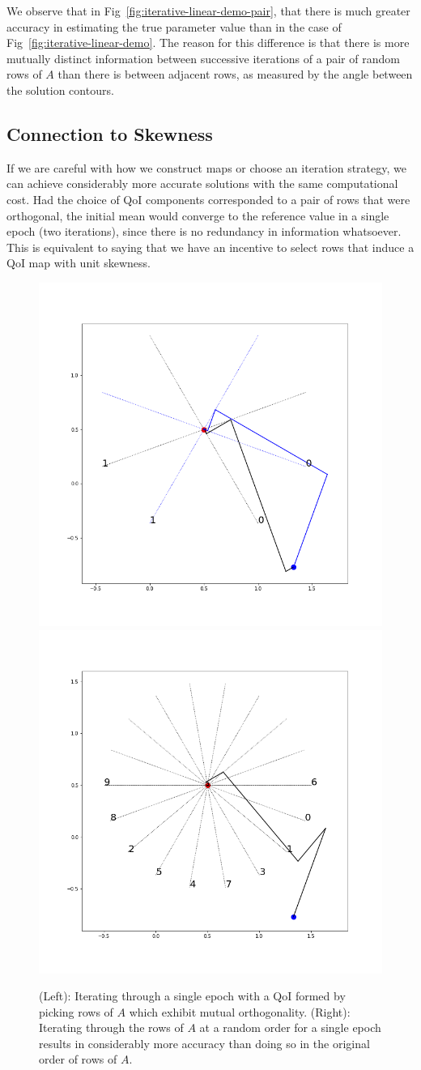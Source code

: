 We observe that in Fig~\ref{fig:iterative-linear-demo-pair}, that there is much greater accuracy in estimating the true parameter value than in the case of Fig~\ref{fig:iterative-linear-demo}.
The reason for this difference is that there is more mutually distinct information between successive iterations of a pair of random rows of $A$ than there is between adjacent rows, as measured by the angle between the solution contours.

\subsection{Connection to Skewness}
If we are careful with how we construct maps or choose an iteration strategy, we can achieve considerably more accurate solutions with the same computational cost.
Had the choice of QoI components corresponded to a pair of rows that were orthogonal, the initial mean would converge to the reference value in a single epoch (two iterations), since there is no redundancy in information whatsoever.
This is equivalent to saying that we have an incentive to select rows that induce a QoI map with unit skewness.

\begin{figure}
  \centering
  \includegraphics[width=0.475\linewidth]{examples/iterative/10D-firstepoch-pair-smart.png}
  \includegraphics[width=0.475\linewidth]{examples/iterative/10D-firstepoch-rand.png}
  \caption{
  (Left): Iterating through a single epoch with a QoI formed by picking rows of $A$ which exhibit mutual orthogonality.
  (Right): Iterating through the rows of $A$ at a random order for a single epoch results in considerably more accuracy than doing so in the original order of rows of $A$.
  }
  \label{fig:iterative-linear-demo-smart}
\end{figure}


